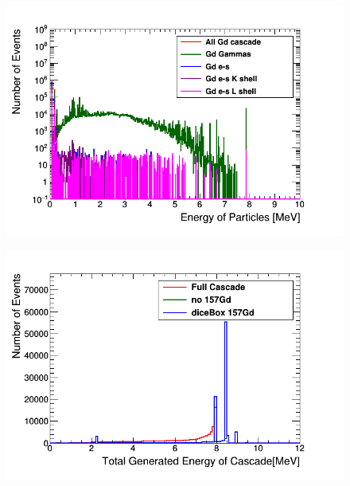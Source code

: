 \begin{figure}[htbp]
 \centering
 \includegraphics[width=0.7\linewidth]{Chapter4/Figs/Raster/gadolinium/gadoliniumEnergiesCascade.png}
 \label{fig:gadoliniumEnergiesCascade}
\end{figure}


\begin{figure}[htbp]
 \centering
 \includegraphics[width=0.7\linewidth]{Chapter4/Figs/Raster/gadolinium/TotalGeneratedEnergyOfCascadeFinalStateDicebox.png}
 \label{fig:TotalGeneratedEnergyOfCascadeFinalStateDicebox}
\end{figure}

